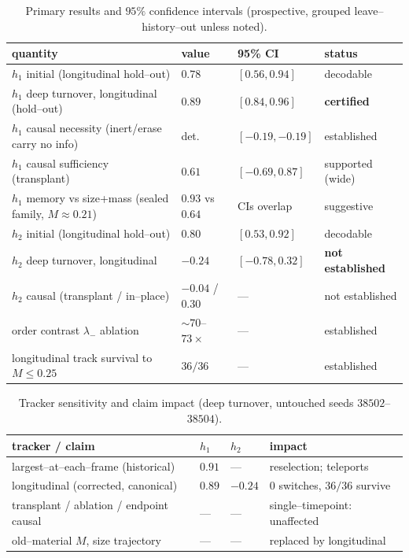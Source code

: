 \documentclass[11pt]{article}
\begin{document}
\begin{table}[t]\centering\small
\caption{Primary results and $95\%$ confidence intervals (prospective, grouped leave--history--out unless noted).}
\label{tab:results}
\begin{tabular}{@{}llll@{}}\toprule
quantity & value & 95\% CI & status\\\midrule
$h_1$ initial (longitudinal hold--out) & $0.78$ & $[0.56,0.94]$ & decodable\\
$h_1$ deep turnover, longitudinal (hold--out) & $0.89$ & $[0.84,0.96]$ & \textbf{certified}\\
$h_1$ causal necessity (inert/erase carry no info) & det. & $[-0.19,-0.19]$ & established\\ $h_1$ causal sufficiency (transplant) & $0.61$ & $[-0.69,0.87]$ & supported (wide)\\
$h_1$ memory vs size+mass (sealed family, $M{\approx}0.21$) & $0.93$ vs $0.64$ & CIs overlap & suggestive\\
$h_2$ initial (longitudinal hold--out) & $0.80$ & $[0.53,0.92]$ & decodable\\
$h_2$ deep turnover, longitudinal & $-0.24$ & $[-0.78,0.32]$ & \textbf{not established}\\
$h_2$ causal (transplant / in--place) & $-0.04$ / $0.30$ & --- & not established\\
order contrast $\lambda_-$ ablation & $\sim$$70$--$73\times$ & --- & established\\
longitudinal track survival to $M{\le}0.25$ & $36/36$ & --- & established\\\bottomrule
\end{tabular}
\end{table}
\begin{table}[t]\centering\small
\caption{Tracker sensitivity and claim impact (deep turnover, untouched seeds $38502$--$38504$).}
\label{tab:tracker}
\begin{tabular}{@{}llll@{}}\toprule
tracker / claim & $h_1$ & $h_2$ & impact\\\midrule
largest--at--each--frame (historical) & $0.91$ & --- & reselection; teleports\\ longitudinal (corrected, canonical) & $0.89$ & $-0.24$ & $0$ switches, $36/36$ survive\\
transplant / ablation / endpoint causal & --- & --- & single--timepoint: unaffected\\
old--material $M$, size trajectory & --- & --- & replaced by longitudinal\\\bottomrule
\end{tabular}
\end{table}
\end{document}
